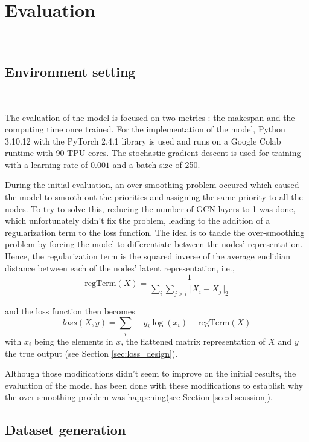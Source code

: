 \section{Evaluation}
~

\subsection{Environment setting}
~

The evaluation of the model is focused on two metrics : the makespan and the computing time once trained.
For the implementation of the model, Python 3.10.12 with the PyTorch 2.4.1 library is used and runs on a Google Colab runtime
with 90 TPU cores.
The stochastic gradient descent is used for training with a learning rate of $0.001$ and a batch size of 250.

During the initial evaluation, an over-smoothing problem\cite{chen2020oversmoothing} occured which caused 
the model to smooth out the priorities and assigning the same priority to all the nodes.
To try to solve this, reducing the number of GCN layers to 1 was done,
which unfortunately didn't fix the problem, leading to the addition
of a regularization term to the loss function.
The idea is to tackle the over-smoothing problem by forcing the model
to differentiate between the nodes' representation.
Hence, the regularization term is the squared inverse of the average euclidian distance 
between each of the nodes' latent representation, i.e., 
\begin{equation}
    \text{regTerm}(X) = \frac{1}{\sum_{i}\sum_{j > i} \Vert X_i - X_j\Vert_{2} }
\end{equation}
    
and the loss function then becomes
\begin{equation}
    loss(X, y) = \sum_{i} -y_i\log(x_i) + \text{regTerm}(X)
\end{equation}
with $x_i$ being the elements in $x$, the flattened matrix representation of $X$
and $y$ the true output (see Section \ref{sec:loss_design}).

Although those modifications didn't seem to improve on the initial results,
the evaluation of the model has been done with these modifications
to establish why the over-smoothing problem was happening(see Section \ref{sec:discussion}).

\subsection{Dataset generation}
~

